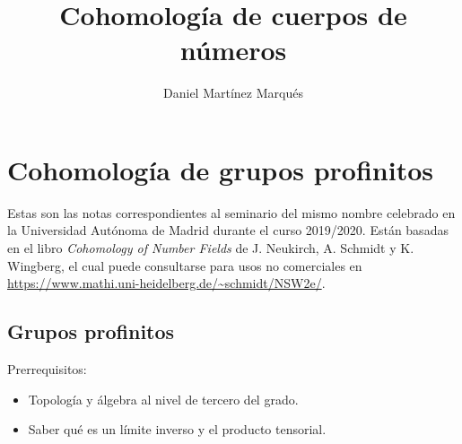 \documentclass[a4paper,12pt, leqno]{report}
\title{Cohomología de cuerpos de números}
\author{Daniel Martínez Marqués}
\begin{document}
\chapter*{Cohomología de grupos profinitos}

Estas son las notas correspondientes al seminario del mismo nombre celebrado en la Universidad Autónoma de Madrid durante el curso 2019/2020. Están basadas en el libro \textit{Cohomology of Number Fields} de J. Neukirch, A. Schmidt y K. Wingberg, el cual puede consultarse para usos no comerciales en \url{https://www.mathi.uni-heidelberg.de/~schmidt/NSW2e/}. 
\begin{center}
\cc \ccby \ccnc
\end{center}
\section*{Grupos profinitos}

Prerrequisitos:

\begin{itemize}
	\item Topología y álgebra al nivel de tercero del grado.
	\item Saber qué es un límite inverso y el producto tensorial.
\end{itemize}
\end{document}
